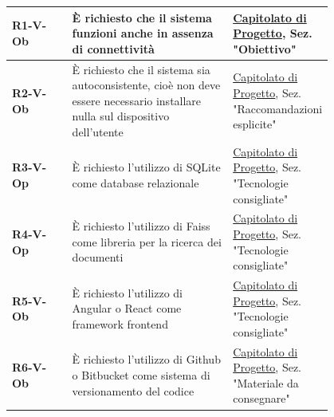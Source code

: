\documentclass[a4paper,12pt]{article}
\begin{document}
{{\begin{longtable}{|l|P{0.5\linewidth}|P{0.3\linewidth}|}
                \textbf{R1-V-Ob} & È richiesto che il sistema funzioni anche in assenza di connettività & \hyperlink{capitolato}{Capitolato di Progetto}, \newline 
                Sez. "Obiettivo" \\
                \hline
                \textbf{R2-V-Ob} & È richiesto che il sistema sia autoconsistente, cioè non deve essere necessario installare nulla sul dispositivo dell’utente & \hyperlink{capitolato}{Capitolato di Progetto}, \newline 
                Sez. "Raccomandazioni esplicite" \\
                \hline
                \textbf{R3-V-Op} & È richiesto l'utilizzo di SQLite come database relazionale & \hyperlink{capitolato}{Capitolato di Progetto}, \newline 
                Sez. "Tecnologie consigliate" \\
                \hline
                \textbf{R4-V-Op} & È richiesto l'utilizzo di Faiss come libreria per la ricerca dei documenti & \hyperlink{capitolato}{Capitolato di Progetto}, \newline 
                Sez. "Tecnologie consigliate" \\
                \hline
                \textbf{R5-V-Ob} & È richiesto l'utilizzo di Angular o React come framework frontend & \hyperlink{capitolato}{Capitolato di Progetto}, \newline 
                Sez. "Tecnologie consigliate" \\
                \hline
                \textbf{R6-V-Ob} & È richiesto l'utilizzo di Github o Bitbucket come sistema di versionamento del codice & \hyperlink{capitolato}{Capitolato di Progetto}, \newline 
                Sez. "Materiale da consegnare" \\
                \hline
            \end{longtable}
        }
    }
\end{document}
